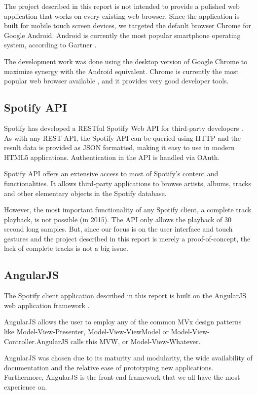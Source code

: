 \documentclass[conference]{IEEEtran}
\begin{document}
The project described in this report is not intended to provide a polished web application that works on every existing web browser.
Since the application is built for mobile touch screen devices, we targeted the default browser Chrome for Google Android.
Android is currently the most popular smartphone operating system, according to Gartner \cite{AndroidMarketShare}.

The development work was done using the desktop version of Google Chrome to maximize synergy with the Android equivalent. Chrome is currently the most popular web browser available \cite{W3Counter}, and it provides very good developer tools.

\subsection{Spotify API}

Spotify has developed a RESTful Spotify Web API for third-party developers \cite{SpotifyAPI}. As with any REST API, the Spotify API can be queried using HTTP and the result data is provided as JSON formatted, making it easy to use in modern HTML5 applications. Authentication in the API is handled via OAuth.

Spotify API offers an extensive access to most of Spotify's content and functionalities. It allows third-party applications to browse artists, albums, tracks and other elementary objects in the Spotify database. 

However, the most important functionality of any Spotify client, a complete track playback, is not possible (in 2015). The API only allows the playback of 30 second long samples. But, since our focus is on the user interface and touch gestures and the project described in this report is merely a proof-of-concept, the lack of complete tracks is not a big issue.

\subsection{AngularJS}
The Spotify client application described in this report is built on the AngularJS web application framework \cite{AngularJS}.

AngularJS allows the user to employ any of the common MVx design patterns like Model-View-Presenter, Model-View-ViewModel or Model-View-Controller.AngularJS calls this MVW, or Model-View-Whatever.

AngularJS was chosen due to its maturity and modularity, the wide availability of documentation and the relative ease of prototyping new applications. Furthermore, AngularJS is the front-end framework that we all have the most experience on.
\end{document}

